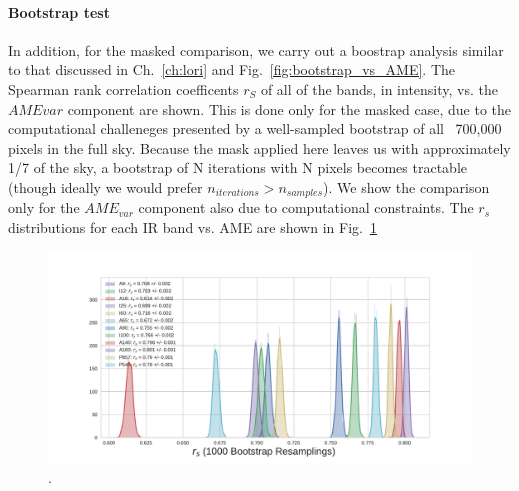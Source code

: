         \paragraph{Bootstrap test}
            In addition, for the masked comparison, we carry out a boostrap analysis similar to that discussed in Ch.~\ref{ch:lori} and Fig.~\ref{fig:bootstrap_vs_AME}. The Spearman rank correlation coefficents $r_{S}$ of all of the bands, in intensity, vs. the $AME{var}$ component are shown. This is done only for the masked case, due to the computational challeneges presented by a well-sampled bootstrap of all ~700,000 pixels in the full sky. Because the mask applied here leaves us with approximately 1/7 of the sky, a bootstrap of N iterations with N pixels becomes tractable (though ideally we would prefer $n_{iterations} > n_{samples}$). We show the comparison only for the $AME_{var}$ component also due to computational constraints. The $r_{s}$ distributions for each IR band vs. AME are shown in Fig.~\ref{fig:bootstrap_vs_AME_allsky_masked}
            \begin{figure}
                 \includegraphics[width=\textwidth]{../Plots/ch_allsky/bootstrap_vs_AME_spearman_maskall_i1000.pdf}
                 \centering
                 \caption{.}
                 \label{fig:bootstrap_vs_AME_allsky_masked}
            \end{figure}

